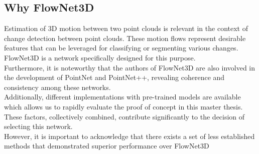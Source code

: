 \subsection{Why FlowNet3D}

Estimation of 3D motion between two point clouds is relevant in the context of change detection between point clouds. These motion flows represent desirable features that can be leveraged for classifying or segmenting various changes. FlowNet3D is a network specifically designed for this purpose.\\

Furthermore, it is noteworthy that the authors of FlowNet3D are also involved in the development of PointNet and PointNet++, revealing coherence and consistency among these networks.\\

Additionally, different implementations with pre-trained models are available which allows us to rapidly evaluate the proof of concept in this master thesis. These factors, collectively combined, contribute significantly to the decision of selecting this network.\\

However, it is important to acknowledge that there exists a set of less established methods that demonstrated superior performance over FlowNet3D \cite{Flow3D}

